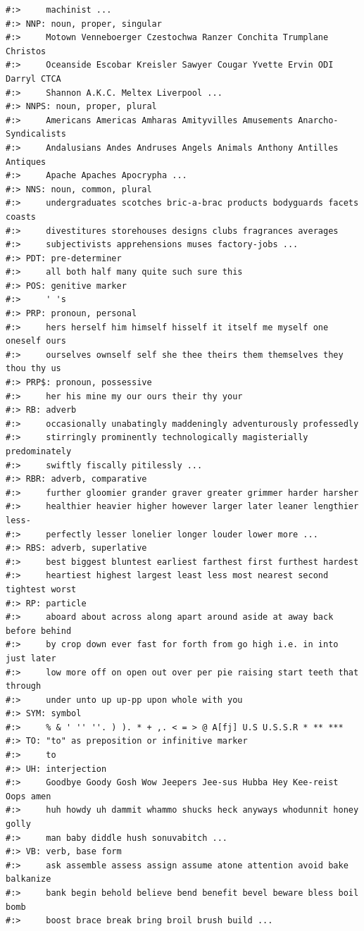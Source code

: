 \documentclass[
]{book}
\begin{document}
\begin{verbatim}
#:>     machinist ...
#:> NNP: noun, proper, singular
#:>     Motown Venneboerger Czestochwa Ranzer Conchita Trumplane Christos
#:>     Oceanside Escobar Kreisler Sawyer Cougar Yvette Ervin ODI Darryl CTCA
#:>     Shannon A.K.C. Meltex Liverpool ...
#:> NNPS: noun, proper, plural
#:>     Americans Americas Amharas Amityvilles Amusements Anarcho-Syndicalists
#:>     Andalusians Andes Andruses Angels Animals Anthony Antilles Antiques
#:>     Apache Apaches Apocrypha ...
#:> NNS: noun, common, plural
#:>     undergraduates scotches bric-a-brac products bodyguards facets coasts
#:>     divestitures storehouses designs clubs fragrances averages
#:>     subjectivists apprehensions muses factory-jobs ...
#:> PDT: pre-determiner
#:>     all both half many quite such sure this
#:> POS: genitive marker
#:>     ' 's
#:> PRP: pronoun, personal
#:>     hers herself him himself hisself it itself me myself one oneself ours
#:>     ourselves ownself self she thee theirs them themselves they thou thy us
#:> PRP$: pronoun, possessive
#:>     her his mine my our ours their thy your
#:> RB: adverb
#:>     occasionally unabatingly maddeningly adventurously professedly
#:>     stirringly prominently technologically magisterially predominately
#:>     swiftly fiscally pitilessly ...
#:> RBR: adverb, comparative
#:>     further gloomier grander graver greater grimmer harder harsher
#:>     healthier heavier higher however larger later leaner lengthier less-
#:>     perfectly lesser lonelier longer louder lower more ...
#:> RBS: adverb, superlative
#:>     best biggest bluntest earliest farthest first furthest hardest
#:>     heartiest highest largest least less most nearest second tightest worst
#:> RP: particle
#:>     aboard about across along apart around aside at away back before behind
#:>     by crop down ever fast for forth from go high i.e. in into just later
#:>     low more off on open out over per pie raising start teeth that through
#:>     under unto up up-pp upon whole with you
#:> SYM: symbol
#:>     % & ' '' ''. ) ). * + ,. < = > @ A[fj] U.S U.S.S.R * ** ***
#:> TO: "to" as preposition or infinitive marker
#:>     to
#:> UH: interjection
#:>     Goodbye Goody Gosh Wow Jeepers Jee-sus Hubba Hey Kee-reist Oops amen
#:>     huh howdy uh dammit whammo shucks heck anyways whodunnit honey golly
#:>     man baby diddle hush sonuvabitch ...
#:> VB: verb, base form
#:>     ask assemble assess assign assume atone attention avoid bake balkanize
#:>     bank begin behold believe bend benefit bevel beware bless boil bomb
#:>     boost brace break bring broil brush build ...

\end{verbatim}
\end{document}
